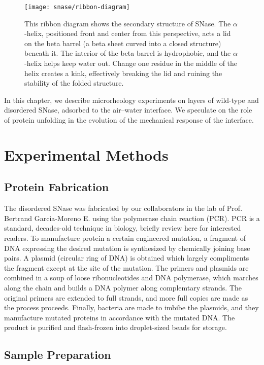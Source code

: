 \begin{figure}
 \texttt{[image: snase/ribbon-diagram]}
 \caption[Ribbon diagram of Wild-Type SNase]{\label{fig:ribbon-diagram}This ribbon diagram shows the secondary structure of SNase. The $\alpha$-helix, positioned front and center from this perspective, acts a lid on the beta barrel (a beta sheet curved into a closed structure) beneath it. The interior of the beta barrel is hydrophobic, and the $\alpha$-helix helps keep water out. Change one residue in the middle of the helix creates a kink, effectively breaking the lid and ruining the stability of the folded structure.}
\end{figure}

In this chapter, we describe microrheology experiments on layers of wild-type and disordered SNase, adsorbed to the air--water interface. We speculate on the role of protein unfolding in the evolution of the mechanical response of the interface.

\section{Experimental Methods}

\subsection{Protein Fabrication}

The disordered SNase was fabricated by our collaborators in the lab of Prof. Bertrand Garcia-Moreno E. using the polymerase chain reaction (PCR). PCR is a standard, decades-old technique in biology, briefly review here for interested readers. To manufacture protein a certain engineered mutation, a fragment of DNA expressing the desired mutation is synthesized by chemically joining base pairs. A plasmid (circular ring of DNA) is obtained which largely compliments the fragment except at the site of the mutation. The primers and plasmids are combined in a soup of loose ribonucleotides and DNA polymerase, which marches along the chain and builds a DNA polymer along complemtary strands. The original primers are extended to full strands, and more full copies are made as the process proceeds. Finally, bacteria are made to imbibe the plasmids, and they manufacture mutated proteins in accordance with the mutated DNA. The product is purified and flash-frozen into droplet-sized beads for storage.

\subsection{Sample Preparation}

